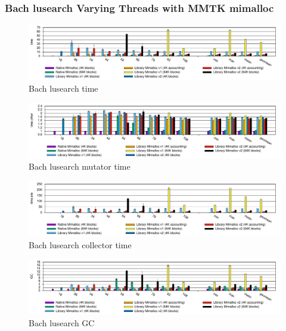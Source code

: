 \documentclass{article}
\begin{document}
\subsubsection{Bach lusearch Varying Threads with MMTK mimalloc}
\begin{figure}[H]
    \centering
    \includegraphics[scale=0.59]{../Figures/Bach-lusearch-small-heap/Bach-lusearch-small-heap-time.pdf}
    \caption{Bach lusearch time}
    \label{Bach lusearch time}
\end{figure}
\begin{figure}[H]
    \centering
    \includegraphics[scale=0.59]{../Figures/Bach-lusearch-small-heap/Bach-lusearch-small-heap-mutator-time.pdf}
    \caption{Bach lusearch mutator time}
    \label{Bach lusearch mutator time}
\end{figure}
\begin{figure}[H]
    \centering
    \includegraphics[scale=0.59]{../Figures/Bach-lusearch-small-heap/Bach-lusearch-small-heap-collector-time.pdf}
    \caption{Bach lusearch collector time}
    \label{Bach lusearch collector time}
\end{figure}
\begin{figure}[H]
    \centering
    \includegraphics[scale=0.59]{../Figures/Bach-lusearch-small-heap/Bach-lusearch-small-heap-GC.pdf}
    \caption{Bach lusearch GC}
    \label{Bach lusearch GC}
\end{figure}
\end{document}
